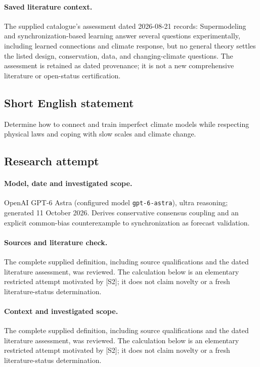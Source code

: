 \documentclass[11pt]{article}
\begin{document}
\paragraph{Saved literature context.} The supplied catalogue's assessment dated 2026-08-21 records: Supermodeling and synchronization-based learning answer several questions experimentally, including learned connections and climate response, but no general theory settles the listed design, conservation, data, and changing-climate questions. The assessment is retained as dated provenance; it is not a new comprehensive literature or open-status certification.
\subsection{Short English statement}
Determine how to connect and train imperfect climate models while respecting physical laws and coping with slow scales and climate change.
\subsection{Research attempt}
\paragraph{Model, date and investigated scope.}
OpenAI GPT-6 Astra (configured model \texttt{gpt-6-astra}), ultra reasoning; generated 11 October 2026. Derives conservative consensus coupling and an explicit common-bias counterexample to synchronization as forecast validation.

\paragraph{Sources and literature check.}
The complete supplied definition, including source qualifications and the dated literature assessment, was reviewed. The calculation below is an elementary restricted attempt motivated by [S2]; it does not claim novelty or a fresh literature-status determination.

\paragraph{Context and investigated scope.} The complete supplied definition, including source qualifications and the dated literature assessment, was reviewed. The calculation below is an elementary restricted attempt motivated by [S2]; it does not claim novelty or a fresh literature-status determination.
\end{document}
